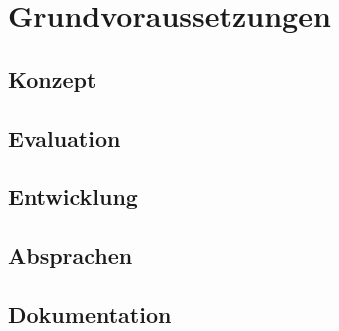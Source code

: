 
\chapter{Grundvoraussetzungen}

\section{Konzept}

\section{Evaluation}

\section{Entwicklung}

\section{Absprachen}

\section{Dokumentation}